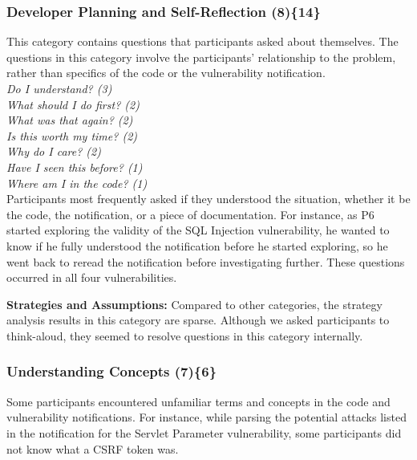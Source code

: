 \documentclass[10pt,journal,compsoc]{IEEEtran}
\begin{document}
\label{sec:results-i}

\subsubsection{Developer Planning and Self-Reflection (8)\{14\}}
\label{dpr}
 
This category contains questions that participants asked about themselves.
The questions in this category involve the participants' relationship to the problem, rather than specifics of the code or the vulnerability notification.
\\

\noindent\emph{Do I understand? (3)} \\
\emph{What should I do first? (2)} \\
\emph{What was that again? (2)} \\
\emph{Is this worth my time? (2)} \\
\emph{Why do I care? (2)} \\
\emph{Have I seen this before? (1)} \\
\emph{Where am I in the code? (1)} 
\\

Participants most frequently asked if they understood the situation, whether it be the code, the notification, or a piece of documentation. 
For instance, as P6 started exploring the validity of the SQL Injection vulnerability, he wanted to know if he fully understood the notification before he started exploring, so he went back to reread the notification before investigating further.
These questions occurred in all four vulnerabilities.


\textbf{Strategies and Assumptions:}
Compared to other categories, the strategy analysis results in this category are sparse.
Although we asked participants to think-aloud, they seemed to resolve questions in this category internally. 



\subsubsection{Understanding Concepts (7)\{6\}}\label{uc}

Some participants encountered unfamiliar terms and concepts in the code and vulnerability notifications.
For instance, while parsing the potential attacks listed in the notification for the Servlet Parameter vulnerability, some participants did not know what a CSRF token was.
\\
\end{document}
